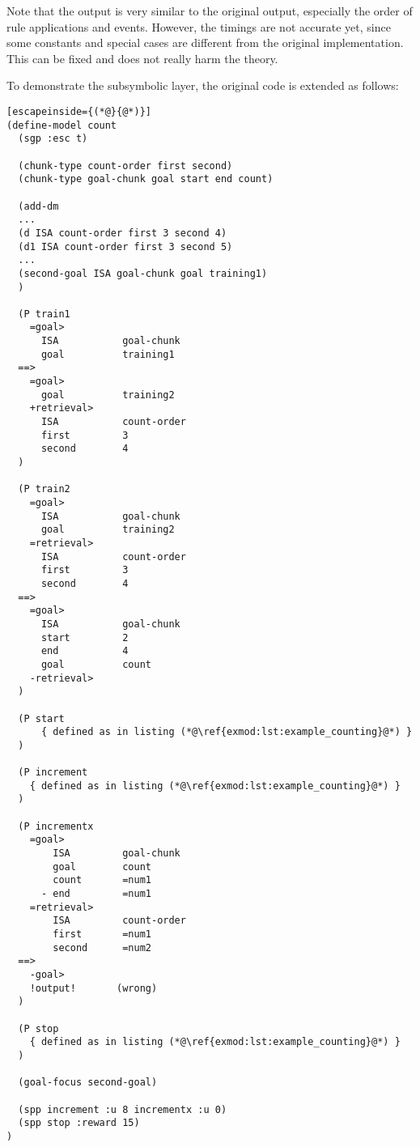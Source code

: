 Note that the output is very similar to the original output, especially the order of rule applications and events. However, the timings are not accurate yet, since some constants and special cases are different from the original implementation. This can be fixed and does not really harm the theory. 

To demonstrate the subsymbolic layer, the original code is extended as follows:

\raggedbottom
\begin{lstlisting}[escapeinside={(*@}{@*)}]
(define-model count
  (sgp :esc t)

  (chunk-type count-order first second)
  (chunk-type goal-chunk goal start end count)

  (add-dm
  ...
  (d ISA count-order first 3 second 4)
  (d1 ISA count-order first 3 second 5)
  ...
  (second-goal ISA goal-chunk goal training1)
  )
  
  (P train1
    =goal>
      ISA           goal-chunk
      goal          training1
  ==>
    =goal>
      goal          training2
    +retrieval>
      ISA           count-order
      first         3
      second        4
  )

  (P train2
    =goal>
      ISA           goal-chunk
      goal          training2
    =retrieval>
      ISA           count-order
      first         3
      second        4
  ==>
    =goal>
      ISA           goal-chunk
      start         2
      end           4
      goal          count
    -retrieval> 
  )
  
  (P start
      { defined as in listing (*@\ref{exmod:lst:example_counting}@*) }
  )

  (P increment
    { defined as in listing (*@\ref{exmod:lst:example_counting}@*) }
  )

  (P incrementx
    =goal>
        ISA         goal-chunk
        goal        count
        count       =num1
      - end         =num1
    =retrieval>
        ISA         count-order
        first       =num1
        second      =num2
  ==>
    -goal>
    !output!       (wrong)
  )

  (P stop
    { defined as in listing (*@\ref{exmod:lst:example_counting}@*) }
  )

  (goal-focus second-goal)

  (spp increment :u 8 incrementx :u 0)
  (spp stop :reward 15)
)
\end{lstlisting}
\flushbottom

